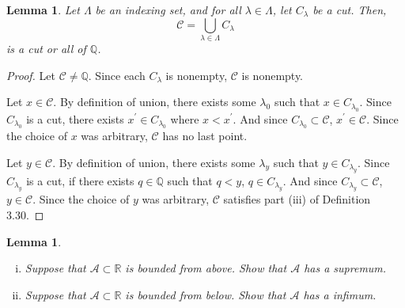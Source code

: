 \documentclass{amsart}
\newtheorem{lemma}[theorem]{Lemma}
\newcommand{\Q}{\mathbb Q}
\newcommand{\R}{\mathbb R}
\newcommand{\1}{\mathds{1}}
\newcommand{\cA}{\mathcal A}
\newcommand{\cB}{\mathcal B}
\def \R {{\mathbb {R}}}
\numberwithin{equation}{section}
\numberwithin{theorem}{section}
\begin{document}
%	

\begin{lemma}
	Let $\Lambda$ be an indexing set, and for all $\lambda\in\Lambda$, let $C_\lambda$ be a cut. Then, $$\mathcal{C} = \bigcup_{\lambda\in\Lambda}C_\lambda$$ is a cut or all of $\Q$.
\end{lemma}

\begin{proof}
	Let $\mathcal{C}\not=\Q$. Since each $C_\lambda$ is nonempty, $\mathcal{C}$ is nonempty.
	
	Let $x\in \mathcal{C}$. By definition of union, there exists some $\lambda_0$ such that $x\in C_{\lambda_0}$. Since $C_{\lambda_0}$ is a cut, there exists $x^\prime \in C_{\lambda_0}$ where $x<x^\prime$. And since $C_{\lambda_0}\subset \mathcal{C}$, $x^\prime\in \mathcal{C}$. Since the choice of $x$ was arbitrary, $\mathcal{C}$ has no last point.
	
	Let $y\in \mathcal{C}$. By definition of union, there exists some $\lambda_y$ such that $y\in C_{\lambda_y}$. Since $C_{\lambda_y}$ is a cut, if there exists $q\in \Q$ such that $q<y$, $q \in C_{\lambda_y}$. And since $C_{\lambda_y}\subset \mathcal{C}$, $y\in \mathcal{C}$. Since the choice of $y$ was arbitrary, $\mathcal{C}$ satisfies part (iii) of Definition 3.30.
\end{proof}

\begin{lemma}
	\begin{enumerate}[(i)]
		\item Suppose that $\cA \subset \R$ is bounded from above.  Show that $\cA$ has a supremum.
		\item Suppose that $\cA \subset \R$ is bounded from below.  Show that $\cA$ has a infimum.
	\end{enumerate}
\end{lemma}
\end{document}
